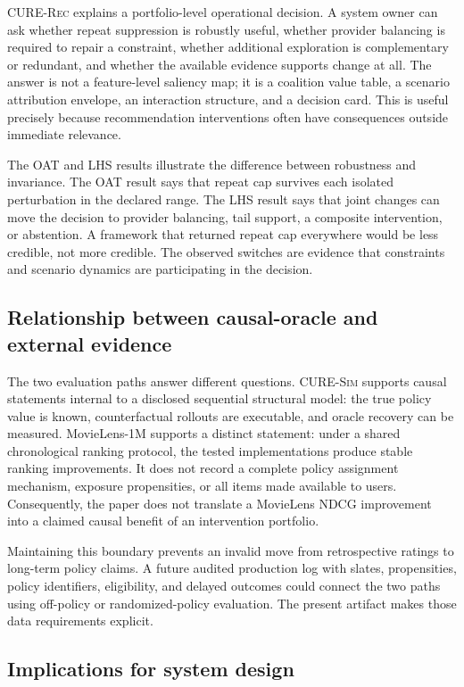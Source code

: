 \documentclass[review]{elsarticle}
\theoremstyle{plain}
\theoremstyle{definition}
\theoremstyle{remark}
\newcommand{\CURE}{\textsc{CURE-Rec}}
\newcommand{\Sim}{\textsc{CURE-Sim}}
\begin{document}
\CURE{} explains a portfolio-level operational decision. A system owner can ask whether repeat suppression is robustly useful, whether provider balancing is required to repair a constraint, whether additional exploration is complementary or redundant, and whether the available evidence supports change at all. The answer is not a feature-level saliency map; it is a coalition value table, a scenario attribution envelope, an interaction structure, and a decision card. This is useful precisely because recommendation interventions often have consequences outside immediate relevance.

The OAT and LHS results illustrate the difference between robustness and invariance. The OAT result says that repeat cap survives each isolated perturbation in the declared range. The LHS result says that joint changes can move the decision to provider balancing, tail support, a composite intervention, or abstention. A framework that returned repeat cap everywhere would be less credible, not more credible. The observed switches are evidence that constraints and scenario dynamics are participating in the decision.

\subsection{Relationship between causal-oracle and external evidence}

The two evaluation paths answer different questions. \Sim{} supports causal statements internal to a disclosed sequential structural model: the true policy value is known, counterfactual rollouts are executable, and oracle recovery can be measured. MovieLens-1M supports a distinct statement: under a shared chronological ranking protocol, the tested implementations produce stable ranking improvements. It does not record a complete policy assignment mechanism, exposure propensities, or all items made available to users. Consequently, the paper does not translate a MovieLens NDCG improvement into a claimed causal benefit of an intervention portfolio.

Maintaining this boundary prevents an invalid move from retrospective ratings to long-term policy claims. A future audited production log with slates, propensities, policy identifiers, eligibility, and delayed outcomes could connect the two paths using off-policy or randomized-policy evaluation. The present artifact makes those data requirements explicit.

\subsection{Implications for system design}
\end{document}

